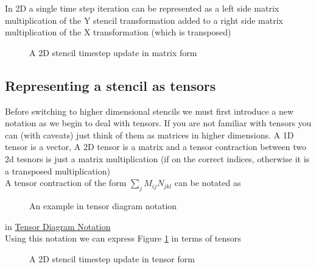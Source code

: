 \documentclass{article}
\begin{document}
In 2D a single time step iteration can be represented as a left side matrix multiplication of the Y stencil transformation added to a right side matrix multiplication of the X transformation (which is transposed) \\

\begin{figure}[H]
	\begin{mdframed}[backgroundcolor=myFigureColour]
		
		\caption{A 2D stencil timestep update in matrix form}
		\label{stencil timestep}
	\end{mdframed}
\end{figure}

\subsection{Representing a stencil as tensors}

Before switching to higher dimensional stencils we must first introduce a new notation as we begin to deal with tensors.
If you are not familiar with tensors you can (with caveats) just think of them as matrices in higher dimensions. A 1D tensor is a vector, A 2D tensor is a matrix and a tensor contraction between two 2d tesnors is just a matrix multiplication (if on the correct indices, otherwise it is a transposed multiplication) \\

A tensor contraction of the form $\sum_j M_{ij}N_{jkl}$ can be notated as \\

\begin{figure}[H]
	\begin{mdframed}[backgroundcolor=myFigureColour]
		
		\caption{An example in tensor diagram notation}
	\end{mdframed}
\end{figure}

in \href{http://tensornetwork.org/diagrams/}{Tensor Diagram Notation} \\

Using this notation we can express Figure \ref{stencil timestep} in terms of tensors

\begin{figure}[H]
	\begin{mdframed}[backgroundcolor=myFigureColour]
		
		\caption{A 2D stencil timestep update in tensor form}
		\label{tensor timestep}
	\end{mdframed}
\end{figure}
\end{document}
